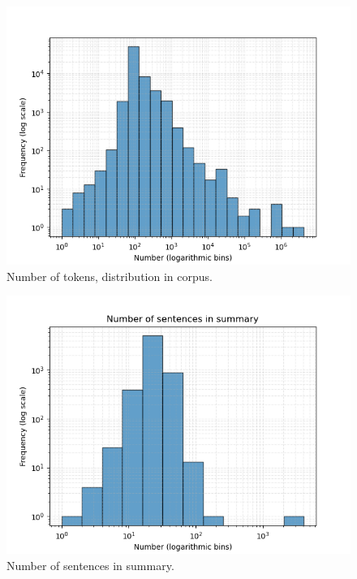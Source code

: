 \begin{figure}[htbp]
\centerline{\includegraphics[width=\linewidth]{"./Number of tokens, distribution in corpus.png"}}
\caption{Number of tokens, distribution in corpus.}
\label{fig}
\end{figure}


\begin{figure}[htbp]
\centerline{\includegraphics[width=\linewidth]{"./Number of sentences in summary.png"}}
\caption{Number of sentences in summary.}
\label{fig}
\end{figure}



